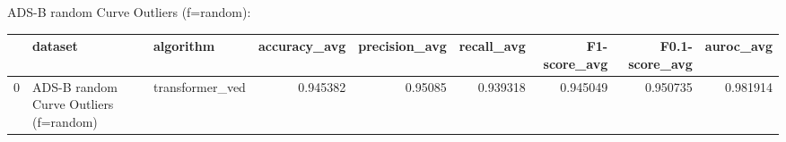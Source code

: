 ADS-B random Curve Outliers (f=random):

\begin{tabular}{rllrrrrrr}
\hline
    & dataset                                & algorithm       &   accuracy\_avg &   precision\_avg &   recall\_avg &   F1-score\_avg &   F0.1-score\_avg &   auroc\_avg \\
\hline
  0 & ADS-B random Curve Outliers (f=random) & transformer\_ved &       0.945382 &         0.95085 &     0.939318 &       0.945049 &         0.950735 &    0.981914 \\
\hline
\end{tabular}

